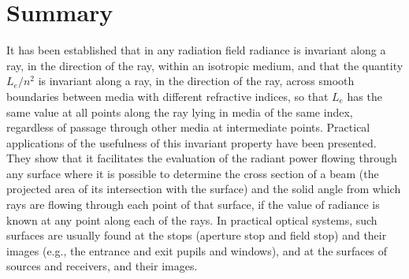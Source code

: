 \section{Summary}

It has been established that in any radiation field radiance is invariant along
a ray, in the direction of the ray, within an isotropic medium, and that the
quantity $L_e/n^2$ is invariant along a ray, in the direction of the ray,
across smooth boundaries between media with different refractive indices,
so that $L_e$ has the same value at all points along the ray lying in media
of the same index, regardless of passage through other media at intermediate
points. Practical applications of the usefulness of this invariant property have
been presented. They show that it facilitates the evaluation of the radiant
power
flowing through any surface where it is possible to determine the cross section
of a beam (the projected area of its intersection with the surface) and the
solid
angle from which rays are flowing through each point of that surface, if the
value
of radiance is known at any point along each of the rays. In practical optical
systems,
such surfaces are usually found at the stops (aperture stop and field stop) and
their images (e.g., the entrance and exit pupils and windows), and at the
surfaces
of sources and receivers, and their images.

